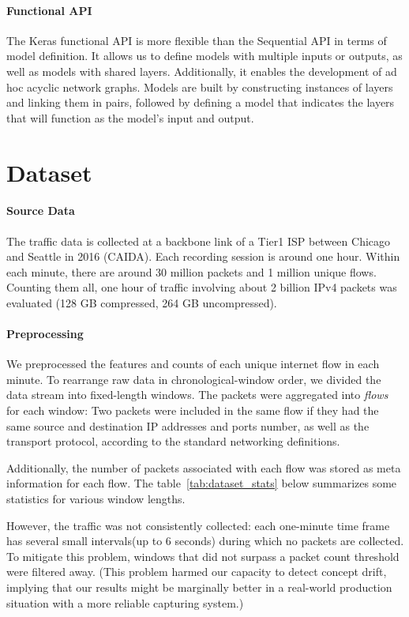 \paragraph{Functional API}
The Keras functional API is more flexible than the Sequential API in terms of model definition.
It allows us to define models with multiple inputs or outputs, as well as models with shared layers.
Additionally, it enables the development of ad hoc acyclic network graphs.
Models are built by constructing instances of layers and linking them in pairs, followed by defining a model that indicates the layers that will function as the model's input and output. 

\section{Dataset}

\paragraph{Source Data}
The traffic data is collected at a backbone link of a Tier1 ISP between Chicago and Seattle in 2016 (CAIDA). Each recording session is around one hour. Within each minute, there are around 30 million packets and 1 million unique flows. Counting them all, one hour of traffic involving about 2 billion IPv4 packets was evaluated (128 GB compressed, 264 GB uncompressed). 

\paragraph{Preprocessing}
We preprocessed the features and counts of each unique internet flow in each minute. To rearrange raw data in chronological-window order, we divided the data stream into fixed-length windows. The packets were aggregated into \emph{flows} for each window: Two packets were included in the same flow if they had the same source and destination IP addresses and ports number, as well as the transport protocol, according to the standard networking definitions. 

Additionally, the number of packets associated with each flow was stored as meta information for each flow. The table~\ref{tab:dataset_stats} below summarizes some statistics for various window lengths. 

However, the traffic was not consistently collected: each one-minute time frame has several small intervals(up to 6 seconds) during which no packets are collected. To mitigate this problem, windows that did not surpass a packet count threshold were filtered away. (This problem harmed our capacity to detect concept drift, implying that our results might be marginally better in a real-world production situation with a more reliable capturing system.) 

